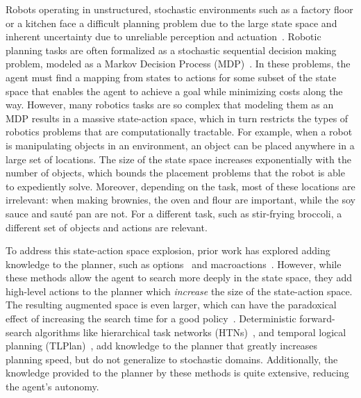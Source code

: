 \documentclass[conference]{IEEEtran}
\begin{document}
Robots operating in unstructured, stochastic environments such as a
factory floor or a kitchen face a difficult planning problem due to
the large state space and inherent uncertainty due to unreliable
perception and actuation~\citep{bollini12,knepper13}.  Robotic
planning tasks are often formalized as a stochastic sequential
decision making problem, modeled as a Markov Decision Process
(MDP)~\citep{thrun2008probabilistic}. In these problems, the agent
must find a mapping from states to actions for some subset of the
state space that enables the agent to achieve a goal while minimizing
costs along the way. However, many robotics tasks are so complex that
modeling them as an MDP results in a massive state-action space, which
in turn restricts the types of robotics problems that are
computationally tractable. For example, when a robot is manipulating
objects in an environment, an object can be placed anywhere in a large
set of locations. The size of the state space increases exponentially
with the number of objects, which bounds the placement problems that
the robot is able to expediently solve.  Moreover, depending on the
task, most of these locations are irrelevant: when making brownies,
the oven and flour are important, while the soy sauce and saut\'{e}
pan are not.  For a different task, such as stir-frying broccoli, a
different set of objects and actions are relevant.

To address this state-action space explosion, prior work has explored
adding knowledge to the planner, such as options~\cite{sutton99} and
macroactions~\cite{Botea:2005kx,Newton:2005vn}.  However, while these
methods allow the agent to search more deeply in the state space, they
add high-level actions to the planner which {\em increase} the size of
the state-action space.  The resulting augmented space is even larger,
which can have the paradoxical effect of increasing the search time
for a good policy~\cite{Jong:2008zr}.  
Deterministic forward-search algorithms like hierarchical task
networks (HTNs)~\citep{Nau:1999:SSH:1624312.1624357}, and temporal
logical planning (TLPlan)~\citep{Bacchus95usingtemporal,Bacchus99usingtemporal},
add knowledge to the planner that greatly increases planning speed, but do
not generalize to stochastic domains. Additionally, the knowledge
provided to the planner by these methods is quite extensive, reducing the
agent's autonomy. 
\end{document}
